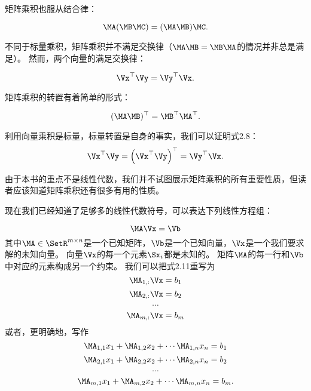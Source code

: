 矩阵乘积也服从结合律：


\begin{equation}
\MA(\MB\MC)=(\MA\MB)\MC.
\end{equation}




不同于标量乘积，矩阵乘积并不满足交换律（$\MA\MB=\MB\MA$的情况并非总是满足）。
然而，两个向量的满足交换律：


\begin{equation}
\Vx^\top\Vy=\Vy^\top\Vx.
\end{equation}


矩阵乘积的转置有着简单的形式：


\begin{equation}
(\MA\MB)^\top=\MB^\top\MA^\top.
\end{equation}


利用向量乘积是标量，标量转置是自身的事实，我们可以证明式2.8：
\begin{equation}
    \Vx^\top \Vy = \left(\Vx^\top \Vy \right)^\top = \Vy^\top \Vx.
\end{equation}


由于本书的重点不是线性代数，我们并不试图展示矩阵乘积的所有重要性质，但读者应该知道矩阵乘积还有很多有用的性质。


现在我们已经知道了足够多的线性代数符号，可以表达下列线性方程组：


\begin{equation}
\MA\Vx=\Vb
\end{equation}
其中$\MA\in \SetR^{m\times n}$是一个已知矩阵，$\Vb$是一个已知向量，$\Vx$是一个我们要求解的未知向量。
向量$\Vx$的每一个元素$\Sx_i$都是未知的。
矩阵$\MA$的每一行和$\Vb$中对应的元素构成另一个约束。
我们可以把式2.11重写为
\begin{equation}\MA_{1,:}\Vx=b_1 \end{equation}
\begin{equation}\MA_{2,:}\Vx=b_2 \end{equation}
\begin{equation}\cdots \end{equation}
\begin{equation}\MA_{m,:}\Vx=b_m \end{equation}
或者，更明确地，写作
\begin{equation}
    \MA_{1,1}x_1+\MA_{1,2}x_2+\cdots \MA_{1,n}x_n = b_1
\end{equation}
\begin{equation}
    \MA_{2,1}x_1+\MA_{2,2}x_2+\cdots \MA_{2,n}x_n = b_2
\end{equation}
\begin{equation}
    \cdots
\end{equation}
\begin{equation}
    \MA_{m,1}x_1+\MA_{m,2}x_2+\cdots \MA_{m,n}x_n = b_m.
\end{equation}


